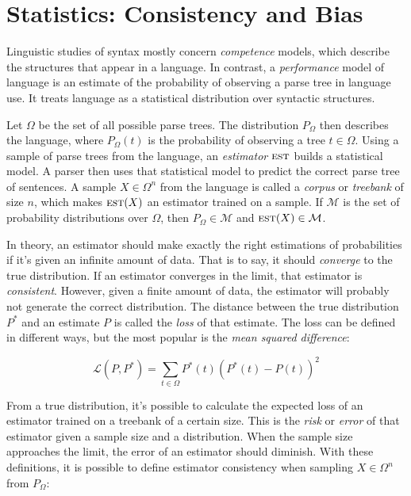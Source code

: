 \section{Statistics: Consistency and Bias}\label{sec:Statistics}


Linguistic studies of syntax mostly concern \emph{competence} models, which describe the structures that appear in a language. In contrast, a \emph{performance} model of language is an estimate of the probability of observing a parse tree in language use. It treats language as a statistical distribution over syntactic structures.

Let $\Omega$ be the set of all possible parse trees. The distribution $P_\Omega$ then describes the language, where $P_\Omega(t)$ is the probability of observing a tree $t \in \Omega$. Using a sample of parse trees from the language, an \emph{estimator} $\textsc{est}$ builds a statistical model. A parser then uses that statistical model to predict the correct parse tree of sentences.
A sample $X \in \Omega^n$ from the language is called a \emph{corpus} or \emph{treebank} of size $n$, which makes $\textsc{est}(X)$ an estimator trained on a sample. If $\mathcal{M}$ is the set of probability distributions over $\Omega$, then $P_\Omega \in \mathcal{M}$ and $\textsc{est}(X) \in \mathcal{M}$.

In theory, an estimator should make exactly the right estimations of probabilities if it's given an infinite amount of data. That is to say, it should \emph{converge} to the true distribution. If an estimator converges in the limit, that estimator is \emph{consistent}.
However, given a finite amount of data, the estimator will probably not generate the correct distribution. The distance between the true distribution $P^*$ and an estimate $P$ is called the \emph{loss} of that estimate. The loss can be defined in different ways, but the most popular is the \emph{mean squared difference}:

$$ \mathcal{L}(P, P^*) =  \sum_{t \in \Omega} P^*(t) (P^*(t)-P(t))^2$$

From a true distribution, it's possible to calculate the expected loss of an estimator trained on a treebank of a certain size. This is the \emph{risk} or \emph{error} of that estimator given a sample size and a distribution. 
When the sample size approaches the limit, the error of an estimator should diminish. With these definitions, it is possible to define estimator consistency when sampling $X \in \Omega^n$ from $P_\Omega$:

